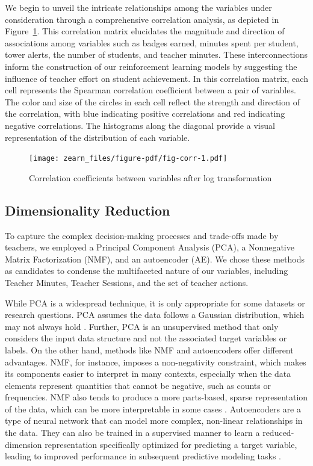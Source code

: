 \documentclass[
  number,
  preprint,
  3p,
  onecolumn]{elsarticle}
\begin{document}
We begin to unveil the intricate relationships among the variables under
consideration through a comprehensive correlation analysis, as depicted
in Figure~\ref{fig-corr}. This correlation matrix elucidates the
magnitude and direction of associations among variables such as badges
earned, minutes spent per student, tower alerts, the number of students,
and teacher minutes. These interconnections inform the construction of
our reinforcement learning models by suggesting the influence of teacher
effort on student achievement. In this correlation matrix, each cell
represents the Spearman correlation coefficient between a pair of
variables. The color and size of the circles in each cell reflect the
strength and direction of the correlation, with blue indicating positive
correlations and red indicating negative correlations. The histograms
along the diagonal provide a visual representation of the distribution
of each variable.

\begin{figure}

{\centering \texttt{[image: zearn\_files/figure-pdf/fig-corr-1.pdf]}

}

\caption{\label{fig-corr}Correlation coefficients between variables
after log transformation}

\end{figure}

\hypertarget{dimensionality-reduction}{%
\subsection{Dimensionality Reduction}\label{dimensionality-reduction}}

To capture the complex decision-making processes and trade-offs made by
teachers, we employed a Principal Component Analysis (PCA), a
Nonnegative Matrix Factorization (NMF), and an autoencoder (AE). We
chose these methods as candidates to condense the multifaceted nature of
our variables, including Teacher Minutes, Teacher Sessions, and the set
of teacher actions.

While PCA is a widespread technique, it is only appropriate for some
datasets or research questions. PCA assumes the data follows a Gaussian
distribution, which may not always hold \citep{jolliffe2016}. Further,
PCA is an unsupervised method that only considers the input data
structure and not the associated target variables or labels. On the
other hand, methods like NMF and autoencoders offer different
advantages. NMF, for instance, imposes a non-negativity constraint,
which makes its components easier to interpret in many contexts,
especially when the data elements represent quantities that cannot be
negative, such as counts or frequencies. NMF also tends to produce a
more parts-based, sparse representation of the data, which can be more
interpretable in some cases \citep{lee1999}. Autoencoders are a type of
neural network that can model more complex, non-linear relationships in
the data. They can also be trained in a supervised manner to learn a
reduced-dimension representation specifically optimized for predicting a
target variable, leading to improved performance in subsequent
predictive modeling tasks \citep{goodfellow2016}.
\end{document}
